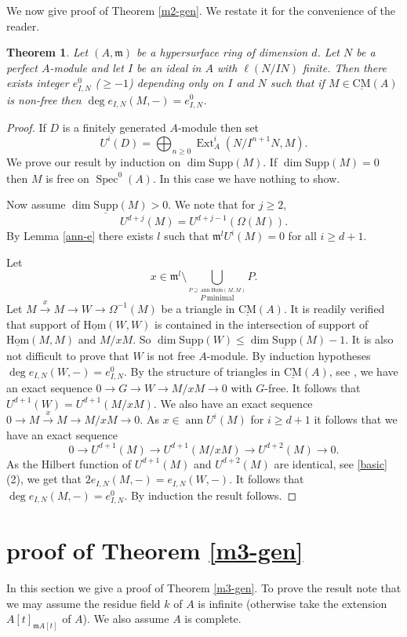 \documentclass{amsart}
\newcommand{\m}{\mathfrak{m} }
\newcommand{\rt}{\rightarrow}
\newcommand{\Om}{\Omega}
\newcommand{\ann}{\operatorname{ann}}
\newcommand{\Supp}{\operatorname{\underline{Supp}}}
\newcommand{\Spec}{\operatorname{Spec}}
\newcommand{\CMS}{\operatorname{\underline{CM}}}
\newcommand{\sHom}{\operatorname{\underline{Hom}}}
\newcommand{\Ext}{\operatorname{Ext}}
\theoremstyle{plain}
\newtheorem{theorem}{Theorem}[section]
\theoremstyle{definition}
\theoremstyle{remark}
\begin{document}
We now give proof of Theorem \ref{m2-gen}. We restate it for the convenience of the reader.
\begin{theorem}\label{m2-gen-body}
Let $(A,\m)$ be a hypersurface ring of dimension $d$. Let $N$ be a perfect $A$-module and let $I$ be an ideal in $A$ with $\ell(N/IN)$ finite. Then
 there exists integer $e_{I, N}^0$  ($\geq -1$) depending only on $I$ and $N$ such that if $M \in \CMS(A)$ is  non-free then
$\deg e_{I,N}(M, -) = e_{I, N}^0$.
\end{theorem}
\begin{proof}
 If $D$ is a finitely generated $A$-module then set $$U^i(D) = \bigoplus_{n \geq 0}\Ext^{i}_A( N/I^{n+1}N, M).$$
We prove our result by induction on $\dim \Supp(M)$. If $\dim \Supp(M) = 0$ then $M$ is free on $\Spec^0(A)$. In this case we have nothing to show.

Now assume $\dim \Supp(M) > 0$.
We note that for $j \geq 2$,  $$U^{d+j}(M) = U^{d+j-1}(\Omega(M)).$$
By Lemma \ref{ann-e} there exists $l$ such that  $\m^l U^i(M) = 0$ for all $i \geq d+1$.

Let
$$x \in \m^l \setminus \bigcup_{ \stackrel{P \supseteq \ann \sHom(M, M)}{P \ \text{minimal}}} P.$$
Let $M \xrightarrow{x} M \rt W \rt \Om^{-1}(M)$ be a triangle in $\CMS(A)$. It is readily verified that support of  $\sHom(W, W)$ is contained in the intersection of support of $\sHom(M,M)$ and $M/x M$. So $\dim \Supp(W) \leq \dim \Supp(M) -1$. It is also not difficult to prove that $W$ is not free $A$-module.  By induction hypotheses  $\deg e_{I, N}(W,-) = e_{I, N}^0$. By the structure of triangles in $\CMS(A)$, see \cite[4.4.1]{Buchw}, we have an exact sequence
$0 \rt G \rt W \rt M/xM \rt 0$ with $G$-free. It follows that $U^{d+1}(W) = U^{d+1}(M/xM)$. We also have an exact sequence
$0 \rt M \xrightarrow{x} M \rt M/xM \rt 0$. As $x \in \ann U^i(M)$ for $i \geq d +1$ it follows that we have an exact sequence
$$ 0 \rt U^{d+1}(M) \rt U^{d+1}(M/xM) \rt U^{d+2}(M) \rt 0.$$
As the Hilbert function of $U^{d+1}(M)$ and $U^{d+2}(M)$ are identical, see  \ref{basic}(2), we get that
$2 e_{I, N}(M, -) = e_{I, N}(W,-)$. It follows that $\deg e_{I, N}(M,-) = e_{I, N}^0$. By induction the result follows.
\end{proof}
\section{proof of Theorem \ref{m3-gen}}
In this section we give a proof of Theorem \ref{m3-gen}. To prove the result note that we may assume the residue field $k$ of $A$ is infinite (otherwise take the extension $A[t]_{\m A[t]}$ of $A$). We also assume $A$ is complete.
\end{document}
